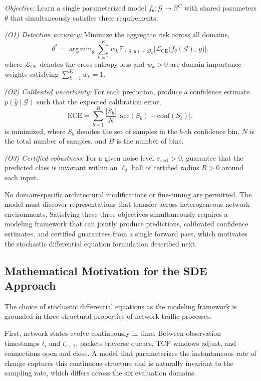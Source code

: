 \documentclass[journal]{IEEEtran}
\newcommand{\R}{\mathbb{R}}
\newcommand{\E}{\mathbb{E}}
\newcommand{\G}{\mathcal{G}}
\newcommand{\D}{\mathcal{D}}
\DeclareMathOperator*{\argmin}{arg\,min}
\begin{document}
\textit{Objective:} Learn a single parameterized model $f_\theta : \G \to \R^C$ with shared parameters $\theta$ that simultaneously satisfies three requirements.

\textit{(O1) Detection accuracy:} Minimize the aggregate risk across all domains,
\begin{equation}
\theta^* = \argmin_\theta \sum_{k=1}^{K} w_k \, \E_{(\G, y) \sim \D_k}\!\Big[\mathcal{L}_{\mathrm{CE}}\big(f_\theta(\G),\, y\big)\Big],
\label{eq:objective}
\end{equation}
where $\mathcal{L}_{\mathrm{CE}}$ denotes the cross-entropy loss and $w_k > 0$ are domain importance weights satisfying $\sum_{k=1}^K w_k = 1$.

\textit{(O2) Calibrated uncertainty:} For each prediction, produce a confidence estimate $p(\hat{y} \mid \G)$ such that the expected calibration error,
\begin{equation}
\mathrm{ECE} = \sum_{b=1}^{B} \frac{|S_b|}{N}\, \big|\mathrm{acc}(S_b) - \mathrm{conf}(S_b)\big|,
\label{eq:ece}
\end{equation}
is minimized, where $S_b$ denotes the set of samples in the $b$-th confidence bin, $N$ is the total number of samples, and $B$ is the number of bins.

\textit{(O3) Certified robustness:} For a given noise level $\sigma_{\mathrm{cert}} > 0$, guarantee that the predicted class is invariant within an $\ell_2$ ball of certified radius $R > 0$ around each input.

No domain-specific architectural modifications or fine-tuning are permitted. The model must discover representations that transfer across heterogeneous network environments. Satisfying these three objectives simultaneously requires a modeling framework that can jointly produce predictions, calibrated confidence estimates, and certified guarantees from a single forward pass, which motivates the stochastic differential equation formulation described next.


\subsection{Mathematical Motivation for the SDE Approach}

The choice of stochastic differential equations as the modeling framework is grounded in three structural properties of network traffic processes.

First, network states evolve continuously in time. Between observation timestamps $t_i$ and $t_{i+1}$, packets traverse queues, TCP windows adjust, and connections open and close. A model that parameterizes the instantaneous rate of change captures this continuous structure and is naturally invariant to the sampling rate, which differs across the six evaluation domains.
\end{document}
